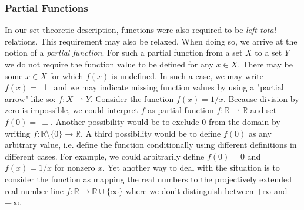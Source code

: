 


\subsubsection{Partial Functions}
In our set-theoretic description, functions were also required to be \emph{left-total} relations. This requirement may also be relaxed. When doing so, we arrive at the notion of a \emph{partial function}. For such a partial function from a set $X$ to a set $Y$ we do not require the function value to be defined for any $x \in X$. There may be some $x \in X$ for which $f(x)$ is undefined. In such a case, we may write $f(x) = \, \perp$ and we may indicate missing function values by using a "partial arrow" like so: $f: X \rightharpoonup Y$. Consider the function $f(x) = 1/x$. Because division by zero is impossible, we could interpret $f$ as partial function $f: \mathbb{R} \rightharpoonup \mathbb{R}$ and set $f(0) = \, \perp$. Another possibility would be to exclude $0$ from the domain by writing $f: \mathbb{R} \setminus \{ 0 \} \rightarrow \mathbb{R}$. A third possibility would be to define $f(0)$ as any arbitrary value, i.e. define the function conditionally using different definitions in different cases. For example, we could arbitrarily define $f(0) = 0$ and $f(x) = 1/x$ for nonzero $x$. Yet another way to deal with the situation is to consider the function as mapping the real numbers to the projectively extended real number line $f: \mathbb{R} \rightarrow \mathbb{R} \cup \{ \infty \}$ where we don't distinguish between $+\infty$ and $-\infty$. %





